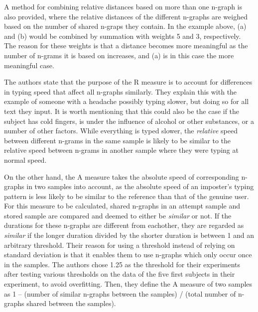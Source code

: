 \documentclass[informationsecurity]{gucmasterproject}
\begin{document}
A method for combining relative distances based on more than one n-graph is also provided, where the relative distances of the different n-graphs are weighed based on the number of shared n-graps they contain. 
In the example above, (a) and (b) would be combined by summation with weights 5 and 3, respectively.
The reason for these weights is that a distance becomes more meaningful as the number of n-grams it is based on increases, and (a) is in this case the more meaningful case.

The authors state that the purpose of the R measure is to account for differences in typing speed that affect all n-graphs similarly.
They explain this with the example of someone with a headache possibly typing slower, but doing so for all text they input.
It is worth mentioning that this could also be the case if the subject has cold fingers, is under the influence of alcohol or other substances, or a number of other factors.
While everything is typed slower, the \textit{relative} speed between different n-grams in the same sample is likely to be similar to the relative speed between n-grams in another sample where they were typing at normal speed.

On the other hand, the A measure takes the absolute speed of corresponding n-graphs in two samples into account, as the absolute speed of an imposter's typing pattern is less likely to be similar to the reference than that of the genuine user.
For this measure to be calculated, shared n-graphs in an attempt sample and stored sample are compared and deemed to either be \textit{similar} or not.
If the durations for these n-graphs are different from eachother, they are regarded as \textit{similar} if the longer duration divided by the shorter duration is between 1 and an arbitrary threshold.
Their reason for using a threshold instead of relying on standard deviation is that it enables them to use n-graphs which only occur once in the samples.
The authors chose 1.25 as the threshold for their experiments after testing various thresholds on the data of the five first subjects in their experiment, to avoid overfitting.
Then, they define the A measure of two samples as 1 -- (number of similar n-graphs between the samples) / (total number of n-graphs shared between the samples).
\end{document}
